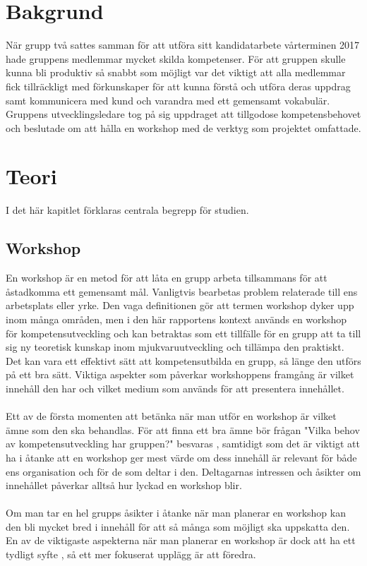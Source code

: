 \section{Bakgrund}
När grupp två sattes samman för att utföra sitt kandidatarbete vårterminen 2017 hade gruppens
medlemmar mycket skilda kompetenser. För att gruppen skulle kunna bli produktiv 
så snabbt som möjligt var det viktigt att alla medlemmar fick tillräckligt med förkunskaper för
att kunna förstå och utföra deras uppdrag samt kommunicera med kund och varandra med ett
gemensamt vokabulär. Gruppens utvecklingsledare tog på sig uppdraget att tillgodose
kompetensbehovet och beslutade om att hålla en workshop med de verktyg som projektet
omfattade.

\section{Teori}
\label{cha:seba-theory}
I det här kapitlet förklaras centrala begrepp för studien.

\subsection{Workshop}
En workshop är en metod för att låta en grupp arbeta tillsammans för att åstadkomma ett gemensamt mål.
Vanligtvis bearbetas problem relaterade till ens arbetsplats eller yrke. \cite{facilitation_made_easy}
Den vaga definitionen gör att termen workshop dyker upp
inom många områden, men i den här rapportens kontext används en workshop 
för kompetensutveckling och kan betraktas som ett tillfälle för en grupp att ta
till sig ny teoretisk kunskap inom mjukvaruutveckling och tillämpa den praktiskt.
Det kan vara ett effektivt sätt att kompetensutbilda en grupp, så länge den utförs på ett bra sätt.
Viktiga aspekter som påverkar workshoppens framgång är vilket innehåll den har och vilket
medium som används för att presentera innehållet. 
\\ \\
Ett av de första momenten att betänka när man utför en workshop är vilket
ämne som den ska behandlas. \cite{facilitation_made_easy} För att finna ett bra ämne
bör frågan "Vilka behov av kompetensutveckling har gruppen?" besvaras \cite{facilitation_made_easy},
samtidigt som det är viktigt att ha i åtanke att en workshop ger mest värde om dess innehåll är
relevant för både ens organisation och för de som deltar i den.\cite{training_basics}
Deltagarnas intressen och åsikter om innehållet påverkar alltså hur lyckad en workshop blir.
\\ \\
Om man tar en hel grupps åsikter i åtanke när man planerar en workshop
kan den bli mycket bred i innehåll för att så många som möjligt ska uppskatta den.
En av de viktigaste aspekterna när man planerar en workshop är dock att
ha ett tydligt syfte \cite{facilitation_made_easy}, så ett mer fokuserat
upplägg är att föredra.

